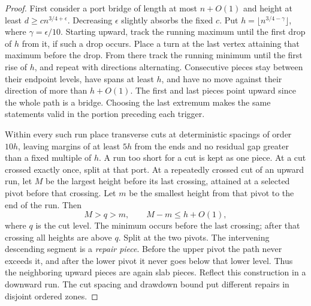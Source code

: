 \begin{proof}
First consider a port bridge of length at most $n+O(1)$ and height at
least $d\ge c n^{3/4+\epsilon}$.  Decreasing $\epsilon$ slightly
absorbs the fixed $c$.  Put
$h=\lfloor n^{3/4-\gamma}\rfloor$, where $\gamma=\epsilon/10$.
Starting upward, track the running maximum until the first drop of
$h$ from it, if such a drop occurs.  Place a turn at the last vertex
attaining that maximum before the drop.  From there track the running
minimum until the first rise of $h$, and repeat with directions
alternating.  Consecutive pieces stay between their endpoint levels,
have spans at least $h$, and have no move against their direction of
more than $h+O(1)$.  The first and last pieces point upward since the
whole path is a bridge.  Choosing the last extremum makes the same
statements valid in the portion preceding each trigger.

Within every such run place transverse cuts at deterministic spacings
of order $10h$, leaving margins of at least $5h$ from the ends and
no residual gap greater than a fixed multiple of $h$.  A run too short
for a cut is kept as one piece.  At a cut crossed exactly once, split
at that port.  At a repeatedly crossed cut of an upward run, let $M$
be the largest height before its last crossing, attained at a selected
pivot before that crossing.  Let $m$ be the smallest height from that
pivot to the end of the run.  Then
\[
                  M>q>m,\qquad M-m\le h+O(1),
\]
where $q$ is the cut level.  The minimum occurs before the last crossing;
after that crossing all heights are above $q$.  Split at the two pivots.
The intervening descending segment is a \emph{repair piece}.  Before
the upper pivot the path never exceeds it, and after the lower pivot it
never goes below that lower level.  Thus the neighboring upward pieces
are again slab pieces.  Reflect this construction in a downward run.
The cut spacing and drawdown bound put different repairs in disjoint
ordered zones.


\end{proof}
